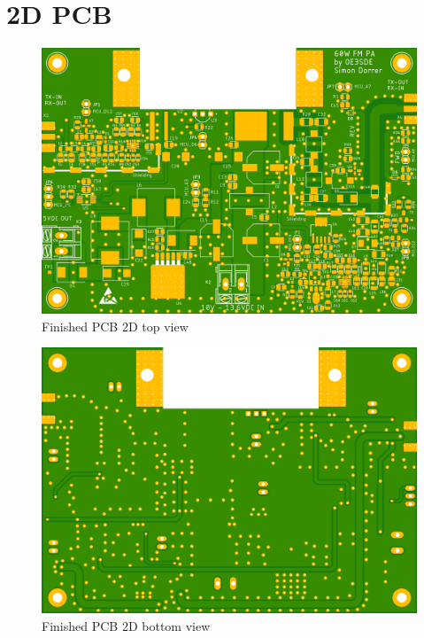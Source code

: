 \newpage
\section{2D PCB}	
	\begin{figure}[ht!]
		\centering
		\includegraphics[width = 14cm]{./3_pcb/fig/PCB_Top}
		\caption{Finished \acs{PCB} 2D top view}
		\label{fig:PCB_Top}
	\end{figure}
	\bigskip
	\begin{figure}[ht!]
		\centering
		\includegraphics[width = 14cm]{./3_pcb/fig/PCB_Bot}
		\caption{Finished \acs{PCB} 2D bottom view}
		\label{fig:PCB_Bot}
	\end{figure}
\newpage